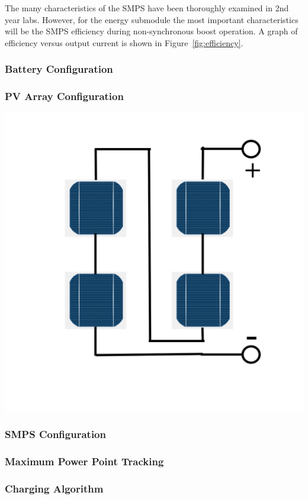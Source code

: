 \documentclass[a4paper]{article}
\begin{document}
The many characteristics of the SMPS have been thoroughly examined in 
2nd year labs. However, for the energy submodule the most important characteristics 
will be the SMPS efficiency during non-synchronous boost operation. A graph of 
efficiency versus output current is shown in Figure~\ref{fig:efficiency}.


\subsubsection{Battery Configuration}

\subsubsection{PV Array Configuration}
    \includegraphics[scale=0.3]{Series(S)}

\subsubsection{SMPS Configuration}

\subsubsection{Maximum Power Point Tracking}

\subsubsection{Charging Algorithm}
\end{document}
